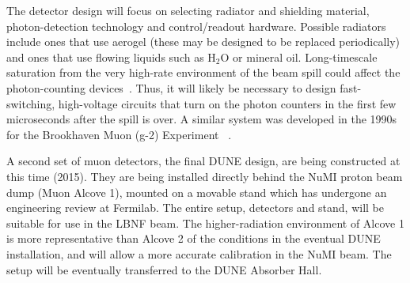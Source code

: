 The detector design will focus on selecting radiator and shielding
material, photon-detection technology and control/readout
hardware. Possible radiators include ones that use aerogel (these may be designed to
be replaced periodically) and ones that use flowing liquids such as H$_2$O or
mineral oil. Long-timescale saturation from the very high-rate
environment of the beam spill could affect the photon-counting
devices~\cite{ref:HighRateCounting}. Thus, it will likely be necessary
to design fast-switching, high-voltage circuits that turn on the
photon counters in the first few microseconds after the spill is
over. A similar system was developed in the 1990s for the Brookhaven
Muon (g-2) Experiment~\cite{ref:G2} .

A second set of muon detectors, the final 
DUNE design, are being
constructed at this time (2015). They are being installed directly
behind the NuMI proton beam dump (Muon Alcove 1), mounted on a movable stand which has undergone an engineering
review at Fermilab. 
%
The entire setup, detectors and stand, will be
suitable for use in the %
LBNF beam. The higher-radiation environment of Alcove 1 is more representative %
than Alcove 2 of the conditions in the eventual DUNE installation, and will 
allow a more accurate calibration in the NuMI
beam. The setup will be eventually transferred to the DUNE Absorber Hall. 

